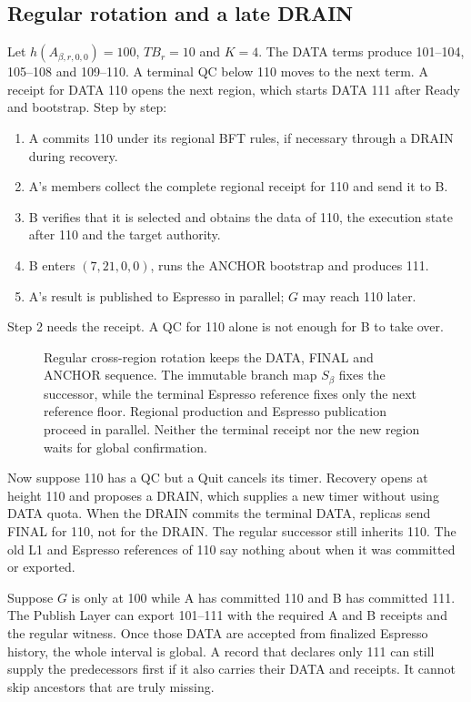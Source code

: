 \documentclass[11pt,a4paper]{article}
\newcommand{\TB}{\mathit{TB}}
\begin{document}
\subsection{Regular rotation and a late DRAIN}
\label{sec:regular-example}
Let $h(A_{\beta,r,0,0})=100$, $\TB_r=10$ and $K=4$. The DATA terms produce
101--104, 105--108 and 109--110. A terminal QC below 110 moves to the next
term. A receipt for DATA 110 opens the next region, which starts DATA 111
after Ready and bootstrap. Step by step:
\begin{enumerate}
\item A commits 110 under its regional BFT rules, if necessary through a
DRAIN during recovery.
\item A's members collect the complete regional receipt for 110 and send
it to B.
\item B verifies that it is selected and obtains the data of 110, the
execution state after 110 and the target authority.
\item B enters $(7,21,0,0)$, runs the ANCHOR bootstrap and produces 111.
\item A's result is published to Espresso in parallel; $G$ may reach 110
later.
\end{enumerate}
Step 2 needs the receipt. A QC for 110 alone is not enough for B to take
over.

\begin{figure}[htbp]\centering

\caption{Regular cross-region rotation keeps the DATA, FINAL and ANCHOR
sequence. The immutable branch map $S_\beta$ fixes the successor, while
the terminal Espresso reference fixes only the next reference floor.
Regional production and Espresso publication proceed in parallel. Neither
the terminal receipt nor the new region waits for global confirmation.}
\label{fig:regular-cross-region}
\end{figure}
\FloatBarrier

Now suppose 110 has a QC but a Quit cancels its timer. Recovery opens at
height 110 and proposes a DRAIN, which supplies a new timer without using
DATA quota. When the DRAIN commits the terminal DATA, replicas send FINAL
for 110, not for the DRAIN. The regular successor still inherits 110. The
old L1 and Espresso references of 110 say nothing about when it was
committed or exported.

Suppose $G$ is only at 100 while A has committed 110 and B has committed
111. The Publish Layer can export 101--111 with the required A and B
receipts and the regular witness. Once those DATA are accepted from
finalized Espresso history, the whole interval is global. A record that
declares only 111 can still supply the predecessors first if it also
carries their DATA and receipts. It cannot skip ancestors that are truly
missing.
\end{document}
